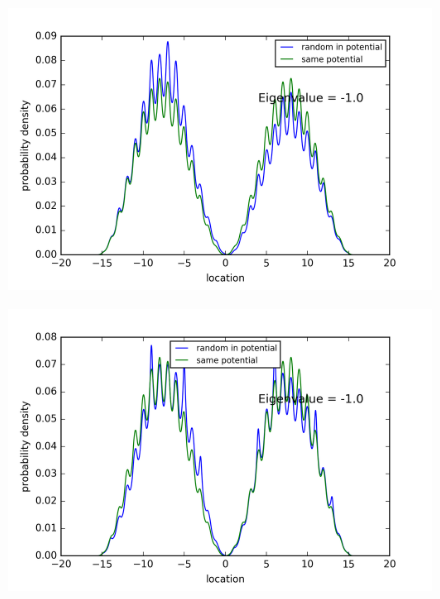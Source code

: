 \begin{figure}[!htbh]
\centering
\begin{minipage}{.45\textwidth}
  \centering
  \includegraphics[width=1.1\linewidth]{RandomPotential2/1_0a_2th_Lowest_Rand0_4_0_5.png}
  \label{fig:randPoa1_2th_0.5_0.4}
\end{minipage}\qquad
\begin{minipage}{.45\textwidth}
  \centering
  \includegraphics[width=1.1\linewidth]{RandomPotential2/1_0a_2th_Lowest_Rand0_2_0_5.png}
  \label{fig:randPoa1_2th_0.5_0.4}
\end{minipage}
\end{figure}

